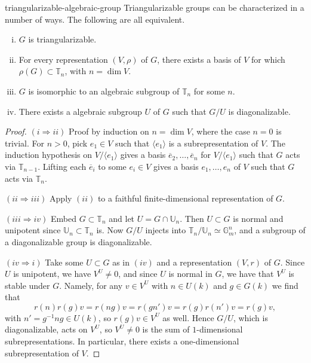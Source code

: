 \begin{example}{triangularizable-algebraic-group}
    Triangularizable groups can be characterized in a number of ways. The following are all equivalent.
    \begin{enumerate}[(i)]
        \item $G$ is triangularizable.
        \item For every representation $(V, \rho)$ of $G$, there exists a basis of $V$ for which $\rho(G) \subset \mathbb{T}_n$, with $n = \dim V$.
        \item $G$ is isomorphic to an algebraic subgroup of $\mathbb{T}_n$ for some $n$.
        \item There exists a   algebraic subgroup $U$ of $G$ such that $G/U$ is diagonalizable.
    \end{enumerate}
    \begin{proof}
        $(i \Rightarrow ii)$ Proof by induction on $n = \dim V$, where the case $n = 0$ is trivial. For $n > 0$, pick $e_1 \in V$ such that $\langle e_1 \rangle$ is a subrepresentation of $V$. The induction hypothesis on $V / \langle e_1 \rangle$ gives a basis $\overline{e}_2, \ldots, \overline{e}_n$ for $V / \langle e_1 \rangle$ such that $G$ acts via $\mathbb{T}_{n - 1}$. Lifting each $\overline{e}_i$ to some $e_i \in V$ gives a basis $e_1, \ldots, e_n$ of $V$ such that $G$ acts via $\mathbb{T}_n$.
        
        $(ii \Rightarrow iii)$ Apply $(ii)$ to a faithful finite-dimensional representation of $G$.
        
        $(iii \Rightarrow iv)$ Embed $G \subset \mathbb{T}_n$ and let $U = G \cap \mathbb{U}_n$. Then $U \subset G$ is normal and unipotent since $\mathbb{U}_n \subset \mathbb{T}_n$ is. Now $G/U$ injects into $\mathbb{T}_n/\mathbb{U}_n \simeq \mathbb{G}_m^n$, and a subgroup of a diagonalizable group is diagonalizable.
        
        $(iv \Rightarrow i)$ Take some $U \subset G$ as in $(iv)$ and a representation $(V, r)$ of $G$. Since $U$ is unipotent, we have $V^U \ne 0$, and since $U$ is normal in $G$, we have that $V^U$ is stable under $G$. Namely, for any $v \in V^U$ with $n \in U(k)$ and $g \in G(k)$ we find that
        \[ r(n) r(g) v = r(ng) v = r(gn') v = r(g) r(n') v = r(g) v , \]
        with $n' = g^{-1} n g \in U(k)$, so $r(g) v \in V^U$ as well. Hence $G/U$, which is diagonalizable, acts on $V^U$, so $V^U \ne 0$ is the sum of $1$-dimensional subrepresentations. In particular, there exists a one-dimensional subrepresentation of $V$.
    \end{proof}
\end{example}

